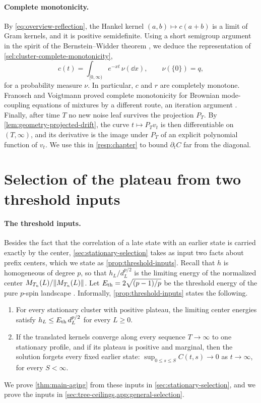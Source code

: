 \paragraph{Complete monotonicity.}
By \eqref{eq:overview-reflection}, the Hankel kernel $(a,b)\mapsto c(a+b)$ is a limit of Gram kernels, and it is positive semidefinite. Using a short semigroup argument in the spirit of the Bernstein--Widder theorem \cite{widder1941,bcr1984}, we deduce the representation of \cref{sel:cluster-complete-monotonicity},
\[
 c(t)=\int_{[0,\infty)}e^{-xt}\,\nu(\dd x),\qquad \nu(\{0\})=q,
\]
for a probability measure $\nu$. In particular, $c$ and $r$ are completely monotone. Franosch and Voigtmann proved complete monotonicity for Brownian mode-coupling equations of mixtures by a different route, an iteration argument \cite[arXiv version~1, Section~III]{fv2002}. Finally, after time $T$ no new noise leaf survives the projection $P_T$. By \cref{lem:geometry-projected-drift}, the curve $t\mapsto P_Tv_t$ is then differentiable on $(T,\infty)$, and its derivative is the image under $P_T$ of an explicit polynomial function of $v_t$. We use this in \cref{resp:chapter} to bound $\partial_tC$ far from the diagonal.

\section{Selection of the plateau from two threshold inputs}\label{sec:overview-selection}

\paragraph{The threshold inputs.}
Besides the fact that the correlation of a late state with an earlier state is carried exactly by the center, \cref{sec:stationary-selection} takes as input two facts about prefix centers, which we state as \cref{prop:threshold-inputs}. Recall that $h$ is homogeneous of degree $p$, so that $h_L/d_L^{p/2}$ is the limiting energy of the normalized center $M_{T_n}(L)/\lVert M_{T_n}(L)\rVert$. Let $E_{\mathrm{th}}=2\sqrt{(p-1)/p}$ be the threshold energy of the pure $p$-spin landscape \cite[Equation~(2.13)]{abc2013}. Informally, \cref{prop:threshold-inputs} states the following.
\begin{enumerate}[label=(\alph*)]
\item For every stationary cluster with positive plateau, the limiting center energies satisfy $h_L\le E_{\mathrm{th}}\,d_L^{p/2}$ for every $L\ge0$.
\item If the translated kernels converge along every sequence $T\to\infty$ to one stationary profile, and if its plateau is positive and marginal, then the solution forgets every fixed earlier state: $\sup_{0\le s\le S}C(t,s)\to0$ as $t\to\infty$, for every $S<\infty$.
\end{enumerate}
We prove \cref{thm:main-aging} from these inputs in \cref{sec:stationary-selection}, and we prove the inputs in \cref{sec:tree-ceilings,app:general-selection}.

